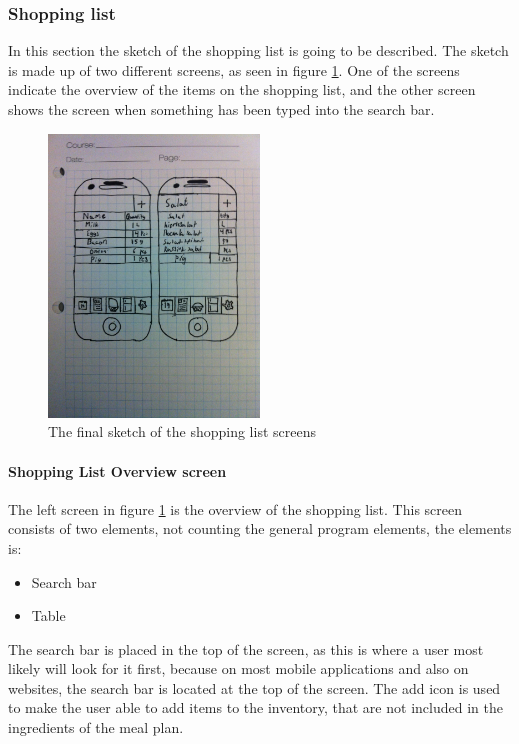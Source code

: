 \subsubsection{Shopping list}

In this section the sketch of the shopping list is going to be described. The sketch is made up of two different screens, as seen in figure \ref{FinalShoppingListSketch}. One of the screens indicate the overview of the items on the shopping list, and the other screen shows the screen when something has been typed into the search bar.

\begin{figure}[H]
    \centering
    \includegraphics[width=0.5\textwidth]{Grafik/FoodPlanner/FinalShoppingListSketch}
    \caption{The final sketch of the shopping list screens}
    \label{FinalShoppingListSketch}
\end{figure}

\paragraph{Shopping List Overview screen}

The left screen in figure \ref{FinalShoppingListSketch} is the overview of the shopping list. This screen consists of two elements, not counting the general program elements, the elements is:

\begin{itemize}
	\item Search bar
	\item Table
\end{itemize}

The search bar is placed in the top of the screen, as this is where a user most likely will look for it first, because on most mobile applications and also on websites, the search bar is located at the top of the screen. The add icon is used to make the user able to add items to the inventory, that are not included in the ingredients of the meal plan.

